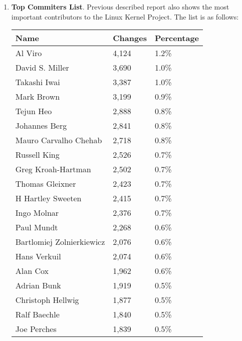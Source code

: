 \documentclass[11pt]{article}
\begin{document}
\begin{enumerate}
\item{\textbf{Top Commiters List}}. Previous described report also shows the most important contributors to the Linux Kernel Project. The list is as follows:
\begin{center}
    \begin{tabular}{ | l | l | l | }
    \hline
    Name & Changes & Percentage\\
    \hline
    Al Viro                    & 4,124 & 1.2\%\\
    David S. Miller            & 3,690 & 1.0\%\\
    Takashi Iwai               & 3,387 & 1.0\%\\
    Mark Brown                 & 3,199 & 0.9\%\\
    Tejun Heo                  & 2,888 & 0.8\%\\
    Johannes Berg              & 2,841 & 0.8\%\\
    Mauro Carvalho Chehab      & 2,718 & 0.8\%\\
    Russell King               & 2,526 & 0.7\%\\
    Greg Kroah-Hartman         & 2,502 & 0.7\%\\
    Thomas Gleixner            & 2,423 & 0.7\%\\
    H Hartley Sweeten          & 2,415 & 0.7\%\\
    Ingo Molnar                & 2,376 & 0.7\%\\
    Paul Mundt                 & 2,268 & 0.6\%\\
    Bartlomiej Zolnierkiewicz  & 2,076 & 0.6\%\\
    Hans Verkuil               & 2,074 & 0.6\%\\
    Alan Cox                   & 1,962 & 0.6\%\\
    Adrian Bunk                & 1,919 & 0.5\%\\
    Christoph Hellwig          & 1,877 & 0.5\%\\
    Ralf Baechle               & 1,840 & 0.5\%\\
    Joe Perches                & 1,839 & 0.5\%\\
    \hline
    \end{tabular}
\end{center}


\end{enumerate}
\end{document}
